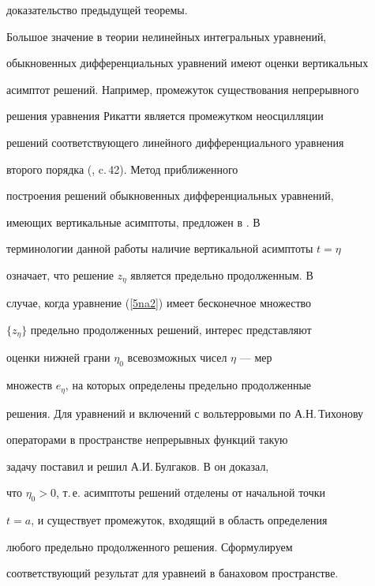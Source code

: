 доказательство предыдущей теоремы.


\medskip








Большое значение в теории нелинейных интегральных уравнений,


обыкновенных дифференциальных уравнений имеют оценки вертикальных


асимптот решений. Например, промежуток существования непрерывного


решения уравнения Рикатти является промежутком неосцилляции


решений соответствующего линейного дифференциального уравнения


второго порядка (\cite{Kamke}, c.\,42). Метод приближенного


построения решений обыкновенных дифференциальных уравнений,


имеющих вертикальные асимптоты, предложен в \cite{Jukparam}. В


терминологии данной работы наличие вертикальной асимптоты $t=\eta$


означает, что решение $z_\eta$ является предельно продолженным. В


случае, когда уравнение (\ref{5na2}) имеет бесконечное множество


$\{z_\eta \}$ предельно продолженных решений, интерес представляют


оценки нижней грани $\eta_0$ всевозможных чисел $\eta$ --- мер


множеств $e_\eta$, на которых определены предельно продолженные


решения. Для уравнений и включений с вольтерровыми по А.Н.\,Тихонову 


операторами в пространстве непрерывных функций такую


задачу поставил и решил А.И.\,Булгаков. В \cite{Bul2} он доказал,


что $\eta_0>0$, т.\,е. асимптоты решений отделены от начальной точки


$t=a$, и существует промежуток, входящий в область определения


любого предельно продолженного решения. Сформулируем


соответствующий результат для уравнеий в банаховом пространстве.








